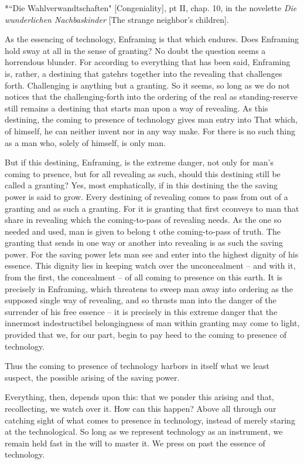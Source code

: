 *``Die Wahlverwandtschaften" [Congeniality], pt II, chap. 10, in the novelette \textit{Die wunderlichen Nachbaskinder} [The strange neighbor's children].

As the essencing of technology, Enframing is that which endures. Does Enframing hold sway at all in the sense of granting? No doubt the question seems a horrendous blunder. For according to everything that has been said, Enframing is, rather, a destining that gatehrs together into the revealing that challenges forth. Challenging is anything but a granting. So it seems, so long as we do not notices that the challenging-forth into the ordering of the real as standing-reserve still remains a destining that starts man upon a way of revealing. As this destining, the coming to presence of technology gives man entry into That which, of himself, he can neither invent nor in any way make. For there is no such thing as a man who, solely of himself, is only man.

But if this destining, Enframing, is the extreme danger, not only for man's coming to prsence, but for all revealing as such, should this destining still be called a granting? Yes, most emphatically, if in this destining the the saving power is said to grow. Every destining of revealing comes to pass from out of a granting and as such a granting. For it is granting that first cconveys to man that share in revealing which the coming-to-pass of revealing needs. As the one so needed and used, man is given to belong t othe coming-to-pass of truth. The granting that sends in one way or another into revealing is as such the saving power. For the saving power lets man see and enter into the highest dignity of his essence. This dignity lies in keeping watch over the unconcealment -- and with it, from the first, the concealment -- of all coming to presence on this earth. It is precisely in Enframing, which threatens to sweep man away into ordering as the supposed single way of revealing, and so thrusts man into the danger of the surrender of his free essence -- it is precisely in this extreme danger that the innermost indestructibel belongingness of man within granting may come to light, provided that we, for our part, begin to pay heed to the coming to presence of technology.

Thus the coming to presence of technology harbors in itself what we least suspect, the possible arising of the saving power. 

Everything, then, depends upon this: that we ponder this arising and that, recollecting, we watch over it. How can this happen? Above all through our catching sight of what comes to presence in technology, instead of merely staring at the technological. So long as we represent technology as an instrument, we remain held fast in the will to master it. We press on past the essence of technology.

